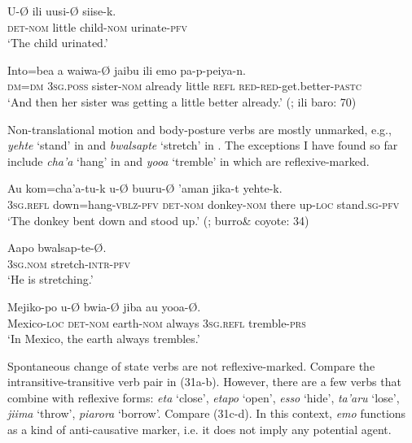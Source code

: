 \documentclass[output=paper]{langscibook}
\begin{document}
\ex
\label{ex:guerrero:29b}
\gll U-Ø   ili  uusi-Ø  siise-k.\\
  \textsc{det-nom}  little   child-\textsc{nom}   urinate-\textsc{pfv}\\
\glt ‘The child urinated.’

\ex
\label{ex:guerrero:29c}
\gll Into=bea  a   waiwa-Ø    jaibu  ili   emo  pa-p-peiya-n.\\
  \textsc{dm=dm}  \textsc{3sg.poss}   sister-\textsc{nom}   already  little  \textsc{refl}   \textsc{red-red}{}-get.better-\textsc{pastc}\\
\glt ‘And then her sister was getting a little better already.’ (\citealt{Buitimea2007}; ili baro: 70)
\z
\z



Non-translational motion and body-posture verbs are mostly unmarked, e.g., \textit{yehte} ‘stand’ in  and \textit{bwalsapte} ‘stretch’ in . The exceptions I have found so far include \textit{cha’a} ‘hang’ in  and \textit{yooa} ‘tremble’ in  which are reflexive-marked.



\ea%
    \label{ex:guerrero:30}

\ea
\label{ex:guerrero:30a}
\gll Au  kom=cha’a-tu-k   u-Ø     buuru-Ø   ’aman   jika-t   yehte-k.\\
  \textsc{3sg.refl}  down=hang-\textsc{vblz-pfv}   \textsc{det-nom}   donkey-\textsc{nom}  there   up-\textsc{loc}   stand.\textsc{sg-pfv}\\
\glt ‘The donkey bent down and stood up.’ (\citealt{Johnson1962}; burro\& coyote: 34)

\ex
\label{ex:guerrero:30b}
\gll Aapo   bwalsap-te-Ø.\\
    \textsc{3sg.nom}  stretch-\textsc{intr}{}-\textsc{pfv}     \\
\glt ‘He is stretching.’

\ex
\label{ex:guerrero:30c}
\gll Mejiko-po   u-Ø   bwia-Ø   jiba   au   yooa-Ø.\\
  Mexico-\textsc{loc}  \textsc{det-nom}  earth-\textsc{nom}  always   \textsc{3sg.refl}   tremble-\textsc{prs}\\
\glt ‘In Mexico, the earth always trembles.’
\z
\z



Spontaneous change of state verbs are not reflexive-marked. Compare the intransitive-transitive verb pair in (31a-b). However, there are a few verbs that combine with reflexive forms: \textit{eta} ‘close’, \textit{etapo} ‘open’, \textit{esso} ‘hide’, \textit{ta’aru} ‘lose’, \textit{jiima} ‘throw’, \textit{piarora} ‘borrow’. Compare (31c-d). In this context, \textit{emo} functions as a kind of anti-causative marker, i.e. it does not imply any potential agent.
\end{document}
